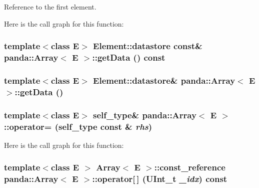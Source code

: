 Reference to the first element. 

Here is the call graph for this function:\hypertarget{classpanda_1_1Array_a8c992f9d8b7c2bff6a3a4a5d9e27b821}{
\subsubsection[{getData}]{\setlength{\rightskip}{0pt plus 5cm}template$<$class E$>$ {\bf Element::datastore} const\& {\bf panda::Array}$<$ E $>$::getData () const}}
\label{classpanda_1_1Array_a8c992f9d8b7c2bff6a3a4a5d9e27b821}
\hypertarget{classpanda_1_1Array_afb11a43b477291e33ee21f9764f118bd}{
\subsubsection[{getData}]{\setlength{\rightskip}{0pt plus 5cm}template$<$class E$>$ {\bf Element::datastore}\& {\bf panda::Array}$<$ E $>$::getData ()}}
\label{classpanda_1_1Array_afb11a43b477291e33ee21f9764f118bd}
\hypertarget{classpanda_1_1Array_ac13ad2768d4cc0fa018fe828b5db377c}{
\subsubsection[{operator=}]{\setlength{\rightskip}{0pt plus 5cm}template$<$class E$>$ {\bf self\_\-type}\& {\bf panda::Array}$<$ E $>$::operator= ({\bf self\_\-type} const \& {\em rhs})}}
\label{classpanda_1_1Array_ac13ad2768d4cc0fa018fe828b5db377c}


Here is the call graph for this function:\hypertarget{classpanda_1_1Array_abbde72bcafdeadb574293543f44a7cf3}{
\subsubsection[{operator[]}]{\setlength{\rightskip}{0pt plus 5cm}template$<$class E $>$ {\bf Array}$<$ E $>$::{\bf const\_\-reference} {\bf panda::Array}$<$ E $>$::operator\mbox{[}$\,$\mbox{]} (UInt\_\-t {\em \_\-idx}) const}}
\label{classpanda_1_1Array_abbde72bcafdeadb574293543f44a7cf3}


